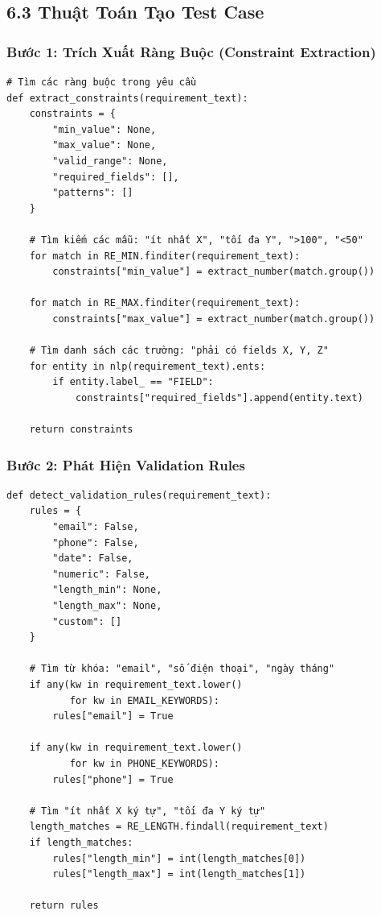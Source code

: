 \documentclass[14pt,a4paper]{article}
\begin{document}
\subsection{6.3 Thuật Toán Tạo Test Case}

\subsubsection{Bước 1: Trích Xuất Ràng Buộc (Constraint Extraction)}

\begin{lstlisting}
# Tìm các ràng buộc trong yêu cầu
def extract_constraints(requirement_text):
    constraints = {
        "min_value": None,
        "max_value": None,
        "valid_range": None,
        "required_fields": [],
        "patterns": []
    }
    
    # Tìm kiếm các mẫu: "ít nhất X", "tối đa Y", ">100", "<50"
    for match in RE_MIN.finditer(requirement_text):
        constraints["min_value"] = extract_number(match.group())
    
    for match in RE_MAX.finditer(requirement_text):
        constraints["max_value"] = extract_number(match.group())
    
    # Tìm danh sách các trường: "phải có fields X, Y, Z"
    for entity in nlp(requirement_text).ents:
        if entity.label_ == "FIELD":
            constraints["required_fields"].append(entity.text)
    
    return constraints
\end{lstlisting}

\subsubsection{Bước 2: Phát Hiện Validation Rules}

\begin{lstlisting}
def detect_validation_rules(requirement_text):
    rules = {
        "email": False,
        "phone": False,
        "date": False,
        "numeric": False,
        "length_min": None,
        "length_max": None,
        "custom": []
    }
    
    # Tìm từ khóa: "email", "số điện thoại", "ngày tháng"
    if any(kw in requirement_text.lower() 
           for kw in EMAIL_KEYWORDS):
        rules["email"] = True
    
    if any(kw in requirement_text.lower() 
           for kw in PHONE_KEYWORDS):
        rules["phone"] = True
    
    # Tìm "ít nhất X ký tự", "tối đa Y ký tự"
    length_matches = RE_LENGTH.findall(requirement_text)
    if length_matches:
        rules["length_min"] = int(length_matches[0])
        rules["length_max"] = int(length_matches[1])
    
    return rules
\end{lstlisting}
\end{document}
